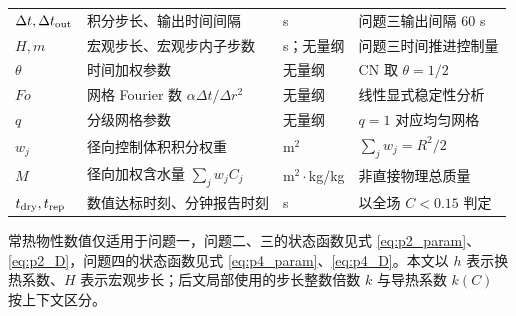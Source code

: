 \begin{table}[H]
{\begin{tabular}{llll}
    $\Delta t,\Delta t_{\rm out}$ & 积分步长、输出时间间隔 & s & 问题三输出间隔 $60$ s \\
    $H,m$ & 宏观步长、宏观步内子步数 & s；无量纲 & 问题三时间推进控制量 \\
    $\theta$ & 时间加权参数 & 无量纲 & CN 取 $\theta=1/2$ \\
    $Fo$ & 网格 Fourier 数 $\alpha\Delta t/\Delta r^2$ & 无量纲 & 线性显式稳定性分析 \\
    $q$ & 分级网格参数 & 无量纲 & $q=1$ 对应均匀网格 \\
    $w_j$ & 径向控制体积积分权重 & m$^2$ & $\sum_jw_j=R^2/2$ \\
    $M$ & 径向加权含水量 $\sum_jw_jC_j$ & m$^2\cdot$kg/kg & 非直接物理总质量 \\
    $t_{\rm dry},t_{\rm rep}$ & 数值达标时刻、分钟报告时刻 & s & 以全场 $C<0.15$ 判定 \\
    \bottomrule
  \end{tabular}}
\end{table}

常热物性数值仅适用于问题一，问题二、三的状态函数见式 \eqref{eq:p2_param}、\eqref{eq:p2_D}，问题四的状态函数见式 \eqref{eq:p4_param}、\eqref{eq:p4_D}。本文以 $h$ 表示换热系数、$H$ 表示宏观步长；后文局部使用的步长整数倍数 $k$ 与导热系数 $k(C)$ 按上下文区分。
